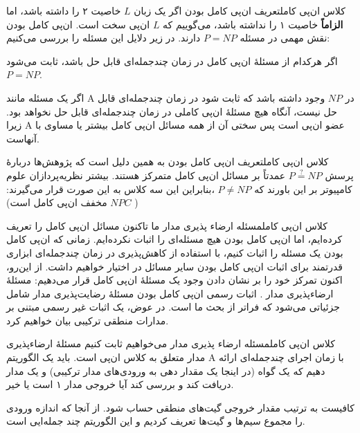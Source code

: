 \begin{itemframe-s}{کلاس ان‌پی کامل}{تعریف ان‌پی کامل بودن}
\itm
اگر یک زبان $L$ خاصیت ۲ را داشته باشد، اما \textbf{الزاماً} خاصیت ۱ را نداشته باشد، می‌گوییم که
 $L$
ان‌پی سخت
 است.
\itm
ان‌پی کامل بودن نقش مهمی در مسئله
$P = NP$
دارند. در زیر دلایل این مسئله را بررسی می‌کنیم:
\item[1]
اگر هرکدام از مسئلهٔ ان‌پی کامل در زمان چندجمله‌ای قابل حل باشد، ثابت می‌شود $P = NP$.
\item[2]
 اگر یک مسئله مانند A در
$NP$
وجود داشته باشد که ثابت شود در زمان چندجمله‌ای قابل حل نیست، آنگاه هیچ مسئلهٔ ان‌پی کاملی در زمان چندجمله‌ای قابل حل نخواهد بود. زیرا A عضو ان‌پی است پس سختی آن از همه مسائل ان‌پی کامل بیشتر یا مساوی با آنهاست.
\end{itemframe-s}


\begin{itemframe-s}{کلاس ان‌پی کامل}{تعریف ان‌پی کامل بودن}
\itm
به همین دلیل است که پژوهش‌ها دربارهٔ پرسش
$P \stackrel{?}{=} NP$
عمدتاً بر مسائل ان‌پی کامل متمرکز هستند.
\itm
بیشتر نظریه‌پردازان علوم کامپیوتر بر این باورند که
$P \ne NP$
،بنابراین این سه کلاس به این صورت قرار می‌گیرند: (
$NPC$
مخفف ان‌پی کامل است)
\end{itemframe-s}


\begin{itemframe-s}{کلاس ان‌پی کامل}{مسئله ارضاء پذیری مدار}
\itm
ما تاکنون مسائل ان‌پی کامل را تعریف کرده‌ایم، اما ان‌پی‌ کامل بودن هیچ مسئله‌ای را اثبات نکرده‌ایم.
\itm
زمانی که ان‌پی‌ کامل بودن یک مسئله را اثبات کنیم، با استفاده از کاهش‌پذیری در زمان چندجمله‌ای ابزاری قدرتمند برای اثبات ان‌پی‌ کامل بودن سایر مسائل در اختیار خواهیم داشت.
\itm
از این‌رو، اکنون تمرکز خود را بر نشان دادن وجود یک مسئلهٔ ان‌پی کامل قرار می‌دهیم: مسئلهٔ ارضاء‌پذیری مدار
 .
\itm
اثبات رسمی ان‌پی‌ کامل بودن مسئلهٔ رضایت‌پذیری مدار شامل جزئیاتی می‌شود که فراتر از بحث ما است. در عوض، یک اثبات غیر رسمی مبتنی بر مدارات منطقی ترکیبی بیان خواهیم کرد.
\end{itemframe-s}


\begin{itemframe-s}{کلاس ان‌پی کامل}{مسئله ارضاء پذیری مدار}
\itm
می‌خواهیم ثابت کنیم مسئلهٔ ارضاء‌پذیری مدار متعلق به کلاس ان‌پی است.
\itm
باید یک الگوریتم A با زمان اجرای چندجمله‌ای ارائه ‌دهیم که یک گواه (در اینجا یک مقدار دهی به ورودی‌های مدار ترکیبی) و یک مدار دریافت کند و بررسی کند آیا خروجی مدار ۱ است یا خیر.

\itm
کافیست به ترتیب مقدار خروجی گیت‌های منطقی حساب شود. از آنجا که اندازه ورودی را مجموع سیم‌ها و گیت‌ها تعریف کردیم و این الگوریتم چند جمله‌ایی است.
\end{itemframe-s}



